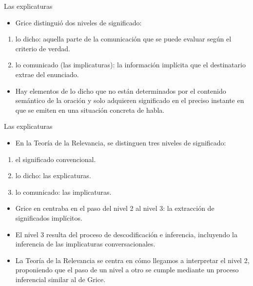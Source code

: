 \documentclass{beamer}
\begin{document}
\begin{frame}{Las explicaturas}

	\begin{itemize}
		\item Grice distinguió dos niveles de significado:
	\end{itemize}
	
	\begin{enumerate}
		\item lo dicho: aquella parte de la comunicación que se puede evaluar según el criterio de verdad.
		\item lo comunicado (las implicaturas): la información implícita que el destinatario extrae del enunciado.
	\end{enumerate}
	
	\begin{itemize}
		\item Hay elementos de lo dicho que no están determinados por el contenido semántico de la oración y solo adquieren significado en el preciso instante en que se emiten en una situación concreta de habla.
	\end{itemize}

\end{frame}

\begin{frame}{Las explicaturas}

	\begin{itemize}
		\item En la Teoría de la Relevancia, se distinguen tres niveles de significado:
	\end{itemize}
	
	\begin{enumerate}
		\item el significado convencional.
		\item lo dicho: las explicaturas.
		\item lo comunicado: las implicaturas.
	\end{enumerate}
	
	\begin{itemize}
		\item Grice en centraba en el paso del nivel 2 al nivel 3: la extracción de significados implícitos. 
		\item El nivel 3 resulta del proceso de descodificación e inferencia, incluyendo la inferencia de las implicaturas conversacionales. 
		\item La Teoría de la Relevancia se centra en cómo llegamos a interpretar el nivel 2, proponiendo que el paso de un nivel a otro se cumple mediante un proceso inferencial similar al de Grice. 
	\end{itemize}

\end{frame}
\end{document}
